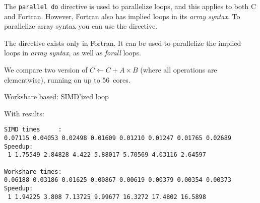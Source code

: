 The \lstinline[language=omp]{parallel do} directive is used to parallelize loops,
and this applies to both C and Fortran. However, Fortran also
has implied loops in its \emph{array syntax}.
To parallelize array syntax you can use the 
directive.

The  directive exists only in Fortran.
It can be used to parallelize
the implied loops in \emph{array syntax},
as well as  \emph{forall} loops.

We compare two version of $C\leftarrow C+A\times B$
(where all operations are elementwise),
running on 
up to 56~cores.

\begin{multicols}{2}
  Workshare based:
  \columnbreak
  SIMD'ized loop
\end{multicols}

With results:

\begin{verbatim}
SIMD times     :
0.07115 0.04053 0.02498 0.01609 0.01210 0.01247 0.01765 0.02689
Speedup:
 1 1.75549 2.84828 4.422 5.88017 5.70569 4.03116 2.64597

Workshare times:
0.06188 0.03186 0.01625 0.00867 0.00619 0.00379 0.00354 0.00373
Speedup:
 1 1.94225 3.808 7.13725 9.99677 16.3272 17.4802 16.5898  
\end{verbatim}
